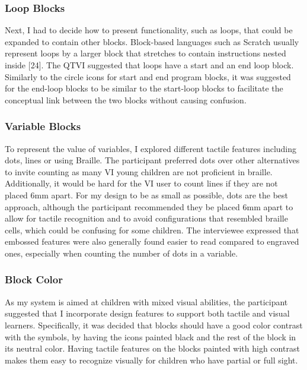 \documentclass[oneside,%
                    author={Malak Hajji},
                    degree={BSc},
                    title={Designing An Accessible Computational Toolkit For Students},
                  subtitle={With Mixed Visual Abilities}]{dissertation}
\begin{document}
\subsubsection{Loop Blocks}
Next, I had to decide how to present functionality, such as loops, that could be expanded to contain other blocks.  Block-based languages such as Scratch usually represent loops by a larger block that stretches to contain instructions nested inside
[24].
The QTVI suggested that loops have a start and an end loop block. Similarly to the circle icons for start and end program blocks, it was suggested for the end-loop blocks to be similar to the start-loop blocks to facilitate the conceptual link between the two blocks without causing confusion.
\subsubsection{Variable Blocks}
To represent the value of variables, I explored different tactile features including dots, lines or using Braille.
The participant preferred dots over other alternatives to invite counting as many VI young children are not proficient in braille. Additionally, it would be hard for the VI user to count lines if they are not placed 6mm apart. For my design to be as small as possible, dots are the best approach, although the participant recommended they be placed 6mm apart to allow for tactile recognition and to avoid configurations that resembled braille cells, which could be confusing for some children. The interviewee expressed that embossed features were also generally found easier to read compared to engraved ones, especially when counting the number of dots in a variable.
\subsubsection{Block Color}
As my system is aimed at children with mixed visual abilities, the participant suggested that I incorporate design features to support both tactile and visual learners. Specifically, it was decided that blocks should have a good color contrast with the symbols, by having the icons painted black and the rest of the block in its neutral color. Having tactile features on the blocks painted with high contrast makes them easy to recognize visually for children who have partial or full sight.
\end{document}
